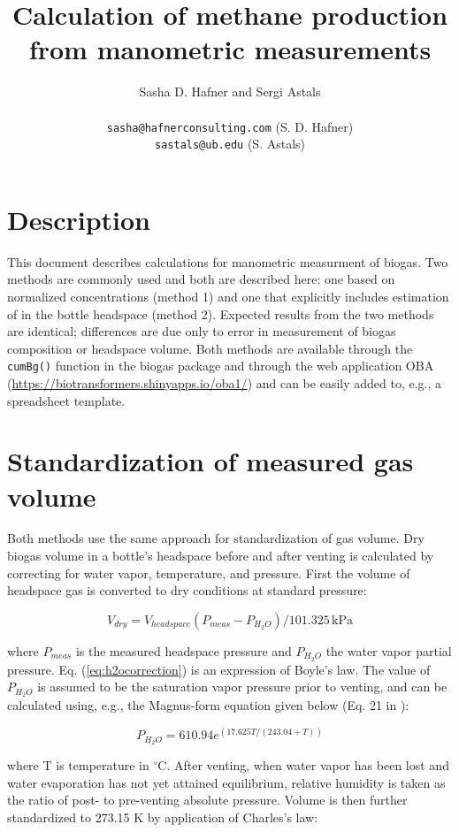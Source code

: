 \documentclass[]{article}
\title {Calculation of methane production from manometric measurements}
\author{Sasha D. Hafner and Sergi Astals\\
\\
\texttt{sasha@hafnerconsulting.com} (S. D. Hafner)\\
\texttt{sastals@ub.edu} (S. Astals)
}
\newcommand{\unit}[1]{\ensuremath{\, \mathrm{#1}}}
\begin{document}
\maketitle

\section*{Description}
This document describes calculations for manometric measurment of biogas.
Two methods are commonly used and both are described here: one based on normalized  concentrations (method 1) and one that explicitly includes estimation of  in the bottle headspace (method 2).
Expected results from the two methods are identical; differences are due only to error in measurement of biogas composition or headspace volume.
Both methods are available through the \texttt{cumBg()} function in the biogas package \cite{softwarex} and through the web application OBA (\url{https://biotransformers.shinyapps.io/oba1/}) and can be easily added to, e.g., a spreadsheet template.

\section{Standardization of measured gas volume}
Both methods use the same approach for standardization of gas volume.
Dry biogas volume in a bottle's headspace before and after venting is calculated by correcting for water vapor, temperature, and pressure.
First the volume of headspace gas is converted to dry conditions at standard pressure:

\begin{equation}
  \label{eq:h2ocorrection}
  V_{dry} = V_{headspace}(P_{meas} - P_{H_2O})/101.325 \unit{kPa}
\end{equation}

where $P_{meas}$ is the measured headspace pressure and $P_{H_2O}$ the water vapor partial pressure.
Eq. (\ref{eq:h2ocorrection}) is an expression of Boyle's law.
The value of $P_{H_2O}$ is assumed to be the saturation vapor pressure prior to venting, and can be calculated using, e.g., the Magnus-form equation given below (Eq. 21 in \cite{magnus}):

\begin{equation}
\label{eq:magnus}
   P_{H_2O} = 610.94 e^{(17.625 T/(243.04 + T))}
\end{equation}

where T is temperature in $^\circ$C.
After venting, when water vapor has been lost and water evaporation has not yet attained equilibrium, relative humidity is taken as the ratio of post- to pre-venting absolute pressure. 
Volume is then further standardized to 273.15 K by application of Charles's law:
\end{document}
